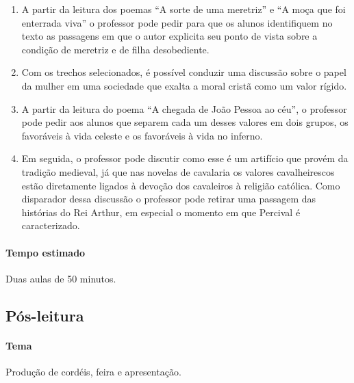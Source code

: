 \documentclass[12pt]{extarticle}
\begin{document}
\begin{enumerate}

\item A partir
da leitura dos poemas ``A sorte de uma meretriz'' e ``A moça que
foi enterrada viva'' o professor pode pedir para
que os alunos identifiquem no texto as passagens em
que o autor explicita seu ponto de vista sobre a condição
de meretriz e de filha desobediente. 

\item Com os
trechos selecionados, é possível conduzir uma discussão
sobre o papel da mulher em uma sociedade que
exalta a moral cristã como um valor rígido.

\item A partir da leitura do poema ``A chegada de João Pessoa ao céu'', o professor
pode pedir aos alunos que separem cada um
desses valores em dois grupos, os favoráveis à vida
celeste e os favoráveis à vida no inferno. 

\item Em seguida,
o professor pode discutir como esse é um artifício que
provém da tradição medieval, já que nas novelas de
cavalaria os valores cavalheirescos estão diretamente
ligados à devoção dos cavaleiros à religião católica.
Como disparador dessa discussão o professor pode
retirar uma passagem das histórias do Rei Arthur, em
especial o momento em que Percival é caracterizado.

\end{enumerate}

\paragraph{Tempo estimado} Duas aulas de 50 minutos.

\subsection{Pós-leitura}



\paragraph{Tema} Produção de cordéis, feira e apresentação.
\end{document}

